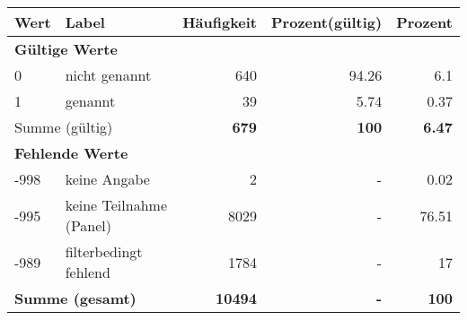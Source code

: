      \begin{longtable}{lXrrr}
     \toprule
     \textbf{Wert} & \textbf{Label} & \textbf{Häufigkeit} & \textbf{Prozent(gültig)} & \textbf{Prozent} \\
     \endhead
     \midrule
     \multicolumn{5}{l}{\textbf{Gültige Werte}}\\

     0 &
     \multicolumn{1}{X}{ nicht genannt   } &


       \num{640} &
       \num[round-mode=places,round-precision=2]{94,26} &
         \num[round-mode=places,round-precision=2]{6,1} \\

     1 &
     \multicolumn{1}{X}{ genannt   } &


       \num{39} &
       \num[round-mode=places,round-precision=2]{5,74} &
         \num[round-mode=places,round-precision=2]{0,37} \\
     \midrule
     \multicolumn{2}{l}{Summe (gültig)} &
       \textbf{\num{679}} &
     \textbf{100} &
       \textbf{\num[round-mode=places,round-precision=2]{6,47}} \\
     \multicolumn{5}{l}{\textbf{Fehlende Werte}}\\
       -998 &
       keine Angabe &
         \num{2} &
        - &
         \num[round-mode=places,round-precision=2]{0,02} \\
       -995 &
       keine Teilnahme (Panel) &
         \num{8029} &
        - &
         \num[round-mode=places,round-precision=2]{76,51} \\
       -989 &
       filterbedingt fehlend &
         \num{1784} &
        - &
         \num[round-mode=places,round-precision=2]{17} \\
     \midrule
     \multicolumn{2}{l}{\textbf{Summe (gesamt)}} &
          \textbf{\num{10494}} &
        \textbf{-} &
        \textbf{100} \\
     \bottomrule
     \end{longtable}
     
